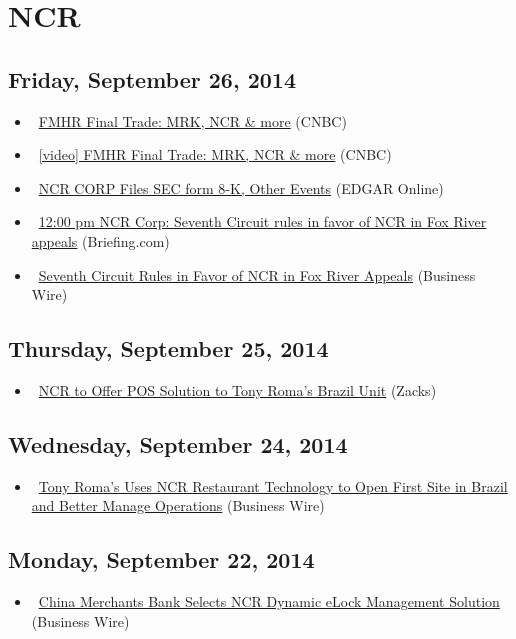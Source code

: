 \documentclass[11pt,asymmetric]{article}
\begin{document}
\section*{NCR}

\subsection*{Friday, September 26, 2014}
\begin{itemize}
\item\ \href{http://finance.yahoo.com/video/fmhr-final-trade-mrk-ncr-165800476.html}{FMHR Final Trade: MRK, NCR \& more} (CNBC)
\item\ \href{http://video.cnbc.com/gallery/?video=3000314137&__source=yahoo%7cheadline%7cquote%7cvideo%7c&par=yahoo}{[video] FMHR Final Trade: MRK, NCR \& more} (CNBC)
\item\ \href{http://biz.yahoo.com/e/140926/ncr8-k.html}{NCR CORP Files SEC form 8-K, Other Events} (EDGAR Online)
\item\ \href{http://finance.yahoo.com/news/inplay-briefing-com-055139997.html#ncr}{12:00 pm NCR Corp: Seventh Circuit rules in favor of NCR in Fox River appeals} (Briefing.com)
\item\ \href{http://finance.yahoo.com/news/seventh-circuit-rules-favor-ncr-155900466.html}{Seventh Circuit Rules in Favor of NCR in Fox River Appeals} (Business Wire)
\end{itemize}
\subsection*{Thursday, September 25, 2014}
\begin{itemize}
\item\ \href{http://finance.yahoo.com/news/ncr-offer-pos-solution-tony-170003659.html}{NCR to Offer POS Solution to Tony Roma's Brazil Unit} (Zacks)
\end{itemize}
\subsection*{Wednesday, September 24, 2014}
\begin{itemize}
\item\ \href{http://finance.yahoo.com/news/tony-roma-uses-ncr-restaurant-120000759.html}{Tony Roma’s Uses NCR Restaurant Technology to Open First Site in Brazil and Better Manage Operations} (Business Wire)
\end{itemize}
\subsection*{Monday, September 22, 2014}
\begin{itemize}
\item\ \href{http://finance.yahoo.com/news/china-merchants-bank-selects-ncr-120000622.html}{China Merchants Bank Selects NCR Dynamic eLock Management Solution} (Business Wire)
\end{itemize}
\end{document}
